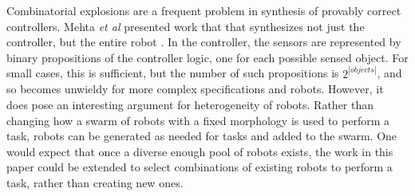 Combinatorial explosions are a frequent problem in synthesis of provably correct controllers. 
Mehta \emph{et al} presented work that that synthesizes not just the controller, but the entire robot \citep{mehta2018robot}.
In the controller, the sensors are represented by binary propositions of the controller logic, one for each possible sensed object.
For small cases, this is sufficient, but the number of such propositions is $2^|objects|$, and so becomes unwieldy for more complex specifications and robots.  
However, it does pose an interesting argument for heterogeneity of robots. 
Rather than changing how a swarm of robots with a fixed morphology is used to perform a task, robots can be generated as needed for tasks and added to the swarm. 
One would expect that once a diverse enough pool of robots exists, the work in this paper could be extended to select combinations of existing robots to perform a task, rather than creating new ones. 

